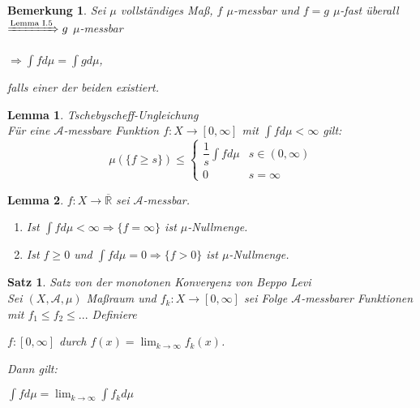 \documentclass[11pt]{memoir}
\theoremstyle{changebreak}
\newtheorem{Bemerkung}{Bemerkung}[chapter]
\newtheorem{Lemma}{Lemma}[chapter]
\newtheorem{Satz}{Satz}[chapter]
\begin{document}
\begin{Bemerkung}
Sei $\mu$ vollständiges Maß, $f$ $\mu$-messbar und $f = g$ $\mu$-fast überall \\
$\xRightarrow{\text{Lemma I.5}} g$ $\mu$-messbar 
\begin{center}
	$\Rightarrow \int f d\mu = \int g d\mu$, 
\end{center}
falls einer der beiden existiert.
\end{Bemerkung}

\begin{Lemma}
\emph{Tschebyscheff-Ungleichung} \\
Für eine $\mathscr A$-messbare Funktion $f: X \rightarrow [0, \infty]$ mit $\int f d\mu < \infty$ gilt: \\
\begin{equation}
	\mu(\{f \geq s\}) \leq
	\begin{cases}
		\dfrac{1}{s}\int f d\mu & s \in (0, \infty) \\
		0 & s = \infty
	\end{cases}
\end{equation}
\end{Lemma}

\begin{Lemma}
$f: X \rightarrow \overline{\mathbb R}$ sei $\mathscr A$-messbar.
\begin{enumerate}
	\item Ist $\int f d\mu < \infty \Rightarrow \{f = \infty\}$ ist $\mu$-Nullmenge.
	\item Ist $f \geq 0$ und $\int f d\mu = 0 \Rightarrow \{f > 0\}$ ist $\mu$-Nullmenge.
\end{enumerate}
\end{Lemma}




\begin{Satz}
\emph{Satz von der monotonen Konvergenz von Beppo Levi} \\
Sei $(X, \mathscr A, \mu)$ Maßraum und $f_k: X \rightarrow [0, \infty]$ sei Folge $\mathscr A$-messbarer Funktionen mit $f_1 \leq f_2 \leq ...$ Definiere 
\begin{center}
	$f: [0, \infty]$ durch $f(x) = \lim_{k \rightarrow \infty} f_k (x)$. 
\end{center}
Dann gilt:
\begin{center}
	$\int f d\mu = \lim_{k\rightarrow \infty} \int f_k d\mu$
\end{center}
\end{Satz}
\end{document}

